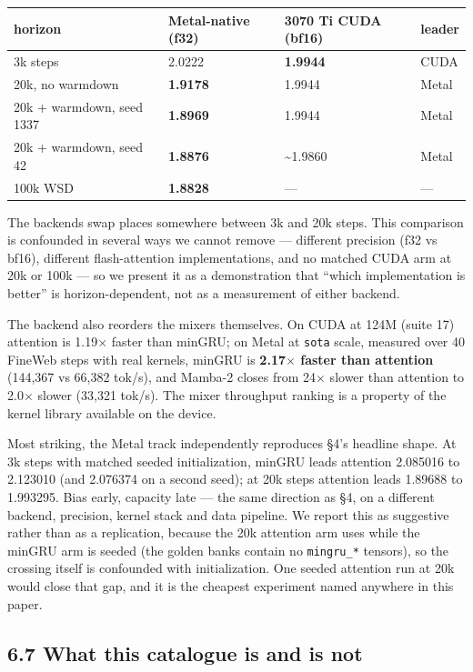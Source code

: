 {%
{\small\begin{longtable}[]{@{}llll@{}}
\toprule\noalign{}
horizon & Metal-native (f32) & 3070 Ti CUDA (bf16) & leader \\
\midrule\noalign{}
\endhead
\bottomrule\noalign{}
\endlastfoot
3k steps & 2.0222 & \textbf{1.9944} & CUDA \\
20k, no warmdown & \textbf{1.9178} & 1.9944 & Metal \\
20k + warmdown, seed 1337 & \textbf{1.8969} & 1.9944 & Metal \\
20k + warmdown, seed 42 & \textbf{1.8876} & \textasciitilde1.9860 & Metal \\
100k WSD & \textbf{1.8828} & --- & --- \\
\end{longtable}}
}

The backends swap places somewhere between 3k and 20k steps. This comparison is confounded in
several ways we cannot remove --- different precision (f32 vs bf16), different flash-attention
implementations, and no matched CUDA arm at 20k or 100k --- so we present it as a demonstration that
``which implementation is better'' is horizon-dependent, not as a measurement of either backend.

The backend also reorders the mixers themselves. On CUDA at 124M (suite 17) attention is 1.19$\times$
faster than minGRU; on Metal at \texttt{sota} scale, measured over 40 FineWeb steps with real kernels,
minGRU is \textbf{2.17$\times$ faster than attention} (144,367 vs 66,382 tok/s), and Mamba-2 closes from 24$\times$
slower than attention to 2.0$\times$ slower (33,321 tok/s). The mixer throughput ranking is a property of
the kernel library available on the device.

Most striking, the Metal track independently reproduces \S4's headline shape. At 3k steps with
matched seeded initialization, minGRU leads attention 2.085016 to 2.123010 (and 2.076374 on a
second seed); at 20k steps attention leads 1.89688 to 1.993295. Bias early, capacity late --- the
same direction as \S4, on a different backend, precision, kernel stack and data pipeline. We
report this as suggestive rather than as a replication, because the 20k attention arm uses
 while the minGRU arm is seeded (the golden banks contain no \texttt{mingru\_*} tensors),
so the crossing itself is confounded with initialization. One seeded attention run at 20k would
close that gap, and it is the cheapest experiment named anywhere in this paper.

\subsection{6.7 What this catalogue is and is not}\label{what-this-catalogue-is-and-is-not}

